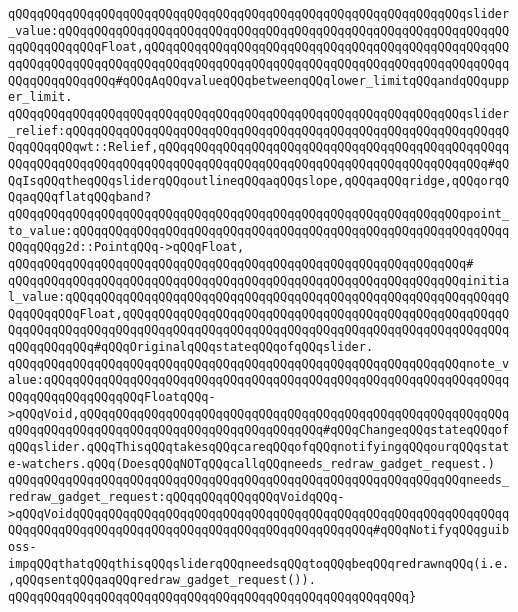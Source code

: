 \verb|qQQqqQQqqQQqqQQqqQQqqQQqqQQqqQQqqQQqqQQqqQQqqQQqqQQqqQQqqQQqqQQqslider_value:qQQqqQQqqQQqqQQqqQQqqQQqqQQqqQQqqQQqqQQqqQQqqQQqqQQqqQQqqQQqqQQqqQQqqQQqqQQqFloat,qQQqqQQqqQQqqQQqqQQqqQQqqQQqqQQqqQQqqQQqqQQqqQQqqQQqqQQqqQQqqQQqqQQqqQQqqQQqqQQqqQQqqQQqqQQqqQQqqQQqqQQqqQQqqQQqqQQqqQQqqQQqqQQqqQQqqQQq#qQQqAqQQqvalueqQQqbetweenqQQqlower_limitqQQqandqQQqupper_limit.|\newline
\verb|qQQqqQQqqQQqqQQqqQQqqQQqqQQqqQQqqQQqqQQqqQQqqQQqqQQqqQQqqQQqqQQqslider_relief:qQQqqQQqqQQqqQQqqQQqqQQqqQQqqQQqqQQqqQQqqQQqqQQqqQQqqQQqqQQqqQQqqQQqqQQqwt::Relief,qQQqqQQqqQQqqQQqqQQqqQQqqQQqqQQqqQQqqQQqqQQqqQQqqQQqqQQqqQQqqQQqqQQqqQQqqQQqqQQqqQQqqQQqqQQqqQQqqQQqqQQqqQQqqQQqqQQq#qQQqIsqQQqtheqQQqsliderqQQqoutlineqQQqaqQQqslope,qQQqaqQQqridge,qQQqorqQQqaqQQqflatqQQqband?|\newline
\verb|qQQqqQQqqQQqqQQqqQQqqQQqqQQqqQQqqQQqqQQqqQQqqQQqqQQqqQQqqQQqqQQqpoint_to_value:qQQqqQQqqQQqqQQqqQQqqQQqqQQqqQQqqQQqqQQqqQQqqQQqqQQqqQQqqQQqqQQqqQQqg2d::PointqQQq->qQQqFloat,|\newline
\verb|qQQqqQQqqQQqqQQqqQQqqQQqqQQqqQQqqQQqqQQqqQQqqQQqqQQqqQQqqQQqqQQq#|\newline
\verb|qQQqqQQqqQQqqQQqqQQqqQQqqQQqqQQqqQQqqQQqqQQqqQQqqQQqqQQqqQQqqQQqinitial_value:qQQqqQQqqQQqqQQqqQQqqQQqqQQqqQQqqQQqqQQqqQQqqQQqqQQqqQQqqQQqqQQqqQQqqQQqFloat,qQQqqQQqqQQqqQQqqQQqqQQqqQQqqQQqqQQqqQQqqQQqqQQqqQQqqQQqqQQqqQQqqQQqqQQqqQQqqQQqqQQqqQQqqQQqqQQqqQQqqQQqqQQqqQQqqQQqqQQqqQQqqQQqqQQqqQQq#qQQqOriginalqQQqstateqQQqofqQQqslider.|\newline
\verb|qQQqqQQqqQQqqQQqqQQqqQQqqQQqqQQqqQQqqQQqqQQqqQQqqQQqqQQqqQQqqQQqnote_value:qQQqqQQqqQQqqQQqqQQqqQQqqQQqqQQqqQQqqQQqqQQqqQQqqQQqqQQqqQQqqQQqqQQqqQQqqQQqqQQqqQQqFloatqQQq->qQQqVoid,qQQqqQQqqQQqqQQqqQQqqQQqqQQqqQQqqQQqqQQqqQQqqQQqqQQqqQQqqQQqqQQqqQQqqQQqqQQqqQQqqQQqqQQqqQQqqQQqqQQqqQQq#qQQqChangeqQQqstateqQQqofqQQqslider.qQQqThisqQQqtakesqQQqcareqQQqofqQQqnotifyingqQQqourqQQqstate-watchers.qQQq(DoesqQQqNOTqQQqcallqQQqneeds_redraw_gadget_request.)|\newline
\verb|qQQqqQQqqQQqqQQqqQQqqQQqqQQqqQQqqQQqqQQqqQQqqQQqqQQqqQQqqQQqqQQqneeds_redraw_gadget_request:qQQqqQQqqQQqqQQqVoidqQQq->qQQqVoidqQQqqQQqqQQqqQQqqQQqqQQqqQQqqQQqqQQqqQQqqQQqqQQqqQQqqQQqqQQqqQQqqQQqqQQqqQQqqQQqqQQqqQQqqQQqqQQqqQQqqQQqqQQqqQQq#qQQqNotifyqQQqguiboss-impqQQqthatqQQqthisqQQqsliderqQQqneedsqQQqtoqQQqbeqQQqredrawnqQQq(i.e.,qQQqsentqQQqaqQQqredraw_gadget_request()).|\newline
\verb|qQQqqQQqqQQqqQQqqQQqqQQqqQQqqQQqqQQqqQQqqQQqqQQqqQQqqQQq}|\newline
